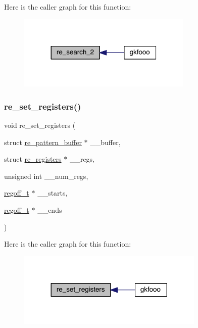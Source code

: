 Here is the caller graph for this function\+:\nopagebreak
\begin{figure}[H]
\begin{center}
\leavevmode
\includegraphics[width=236pt]{a00092_a800bad488847a47475a7338a62c02ab7_icgraph}
\end{center}
\end{figure}
\mbox{\label{a00092_af11ebb49eb67fe216d9adabe548dc951}} 
\subsubsection{\texorpdfstring{re\+\_\+set\+\_\+registers()}{re\_set\_registers()}}
{\footnotesize\ttfamily void re\+\_\+set\+\_\+registers (\begin{DoxyParamCaption}\item[{struct \hyperlink{a00686}{re\+\_\+pattern\+\_\+buffer} $\ast$}]{\+\_\+\+\_\+buffer,  }\item[{struct \hyperlink{a00690}{re\+\_\+registers} $\ast$}]{\+\_\+\+\_\+regs,  }\item[{unsigned int}]{\+\_\+\+\_\+num\+\_\+regs,  }\item[{\hyperlink{a00092_a5b34995b47432512ee4ffa32b836e65f}{regoff\+\_\+t} $\ast$}]{\+\_\+\+\_\+starts,  }\item[{\hyperlink{a00092_a5b34995b47432512ee4ffa32b836e65f}{regoff\+\_\+t} $\ast$}]{\+\_\+\+\_\+ends }\end{DoxyParamCaption})}

Here is the caller graph for this function\+:\nopagebreak
\begin{figure}[H]
\begin{center}
\leavevmode
\includegraphics[width=252pt]{a00092_af11ebb49eb67fe216d9adabe548dc951_icgraph}
\end{center}
\end{figure}
\mbox{\label{a00092_ad71c2bb1368325a350179abb1b0e6210}} 
